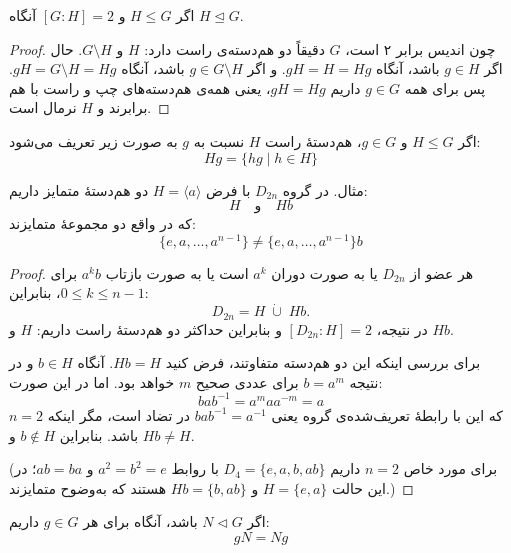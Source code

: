 \begin{theorem}
    اگر \( H \leq G \) و \( [G : H] = 2 \) آنگاه \( H \trianglelefteq G \).
\end{theorem}

\begin{proof}
    چون اندیس برابر ۲ است، \( G \) دقیقاً دو هم‌دسته‌ی راست دارد: \( H \) و \( G \setminus H \).
    حال اگر \( g \in H \) باشد، آنگاه \( gH = H = Hg \).
    و اگر \( g \in G \setminus H \) باشد، آنگاه \( gH = G \setminus H = Hg \).
    پس برای همه \( g \in G \) داریم \( gH = Hg \)، یعنی همه‌ی هم‌دسته‌های چپ و راست با هم برابرند و \( H \) نرمال است.
\end{proof}

\begin{definition}
    اگر \( H \leq G \) و \( g \in G \)، هم‌دستهٔ راست \( H \) نسبت به \( g \) به صورت زیر تعریف می‌شود:
    \[
        Hg = \{ hg \mid h \in H \}
    \]
\end{definition}




\begin{example}
    مثال. در گروه $D_{2n}$ با فرض $H = \langle a \rangle$ دو هم‌دستهٔ متمایز داریم:
    \[
        H \quad \text{و} \quad Hb
    \]
    که در واقع دو مجموعهٔ متمایزند:
    \[
        \{e, a, \ldots, a^{n-1} \} \neq \{e, a, \ldots, a^{n-1} \}b
    \]
\end{example}



\begin{proof}
    هر عضو از \(D_{2n}\) یا به صورت دوران \(a^k\) است یا به صورت بازتاب \(a^k b\) برای \(0\le k\le n-1\)، بنابراین:
    \[
        D_{2n}=H\;\dot\cup\;Hb.
    \]
    در نتیجه، \([D_{2n}:H]=2\) و بنابراین حداکثر دو هم‌دستهٔ راست داریم: \(H\) و \(Hb\).

    برای بررسی اینکه این دو هم‌دسته متفاوتند، فرض کنید \(Hb = H\). آنگاه \(b \in H\) و در نتیجه \(b = a^m\) برای عددی صحیح \(m\) خواهد بود. اما در این صورت:
    \[
        bab^{-1}=a^m a a^{-m}=a
    \]
    که این با رابطهٔ تعریف‌شده‌ی گروه یعنی \(bab^{-1} = a^{-1}\) در تضاد است، مگر اینکه \(n=2\) باشد. بنابراین \(b\notin H\) و \(Hb\ne H\).

    (برای مورد خاص \(n=2\) داریم \(D_4=\{e,a,b,ab\}\) با روابط \(a^2=b^2=e\) و \(ab=ba\)؛ در این حالت
    \(H=\{e,a\}\) و \(Hb=\{b,ab\}\) هستند که به‌وضوح متمایزند.)
\end{proof}



\begin{lemma}
    اگر $N \triangleleft G$ باشد، آنگاه برای هر $g \in G$ داریم:
    \[
        gN = Ng
    \]
\end{lemma}


